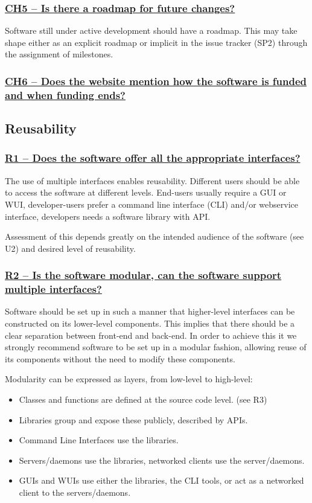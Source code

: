 \documentclass[a4paper,11pt]{article}
\newcommand{\indicator}[1]{\subsubsection*{\underline{#1}}}
\begin{document}
\indicator{CH5 -- Is there a roadmap for future changes?}

Software still under active development should have a roadmap. This may take
shape either as an explicit roadmap or implicit in the issue tracker
(SP2) through the assignment of milestones.

\indicator{CH6 -- Does the website mention how the software is funded and
when funding ends?}

\subsection{Reusability}

\indicator{R1 -- Does the software offer all the appropriate interfaces?}

The use of multiple interfaces enables reusability. Different users should be
able to access the software at different levels. End-users usually require a
GUI or WUI, developer-users prefer a command line interface (CLI) and/or
webservice interface, developers needs a software library with API.

Assessment of this depends greatly on the intended audience of the software
(see U2) and desired level of reusability.

\indicator{R2 -- Is the software modular, can the software support multiple interfaces?}

Software should be set up in such a manner that higher-level interfaces can be
constructed on its lower-level components. This implies that there should be a
clear separation between front-end and back-end. In order to achieve this it we
strongly recommend software to be set up in a modular fashion, allowing reuse
of its components without the need to modify these components.

Modularity can be expressed as layers, from low-level to high-level:

\begin{itemize}
 \item Classes and functions are defined at the source code level. (see R3)
 \item Libraries group and expose these publicly, described by APIs. 
 \item Command Line Interfaces use the libraries.
 \item Servers/daemons use the libraries, networked clients use the server/daemons.
 \item GUIs and WUIs use either the libraries, the CLI tools, or act as a networked client to the servers/daemons.
\end{itemize}
\end{document}
